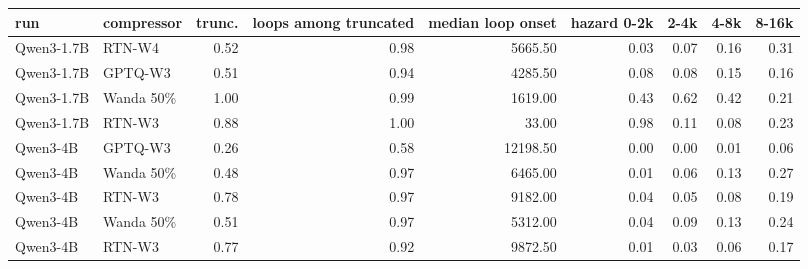 \begin{tabular}{llrrrrrrr}
\toprule
run & compressor & trunc. & loops among truncated & median loop onset & hazard 0-2k & 2-4k & 4-8k & 8-16k \\
\midrule
Qwen3-1.7B & RTN-W4 & 0.52 & 0.98 & 5665.50 & 0.03 & 0.07 & 0.16 & 0.31 \\
Qwen3-1.7B & GPTQ-W3 & 0.51 & 0.94 & 4285.50 & 0.08 & 0.08 & 0.15 & 0.16 \\
Qwen3-1.7B & Wanda 50\% & 1.00 & 0.99 & 1619.00 & 0.43 & 0.62 & 0.42 & 0.21 \\
Qwen3-1.7B & RTN-W3 & 0.88 & 1.00 & 33.00 & 0.98 & 0.11 & 0.08 & 0.23 \\
Qwen3-4B & GPTQ-W3 & 0.26 & 0.58 & 12198.50 & 0.00 & 0.00 & 0.01 & 0.06 \\
Qwen3-4B & Wanda 50\% & 0.48 & 0.97 & 6465.00 & 0.01 & 0.06 & 0.13 & 0.27 \\
Qwen3-4B & RTN-W3 & 0.78 & 0.97 & 9182.00 & 0.04 & 0.05 & 0.08 & 0.19 \\
Qwen3-4B & Wanda 50\% & 0.51 & 0.97 & 5312.00 & 0.04 & 0.09 & 0.13 & 0.24 \\
Qwen3-4B & RTN-W3 & 0.77 & 0.92 & 9872.50 & 0.01 & 0.03 & 0.06 & 0.17 \\
\bottomrule
\end{tabular}
